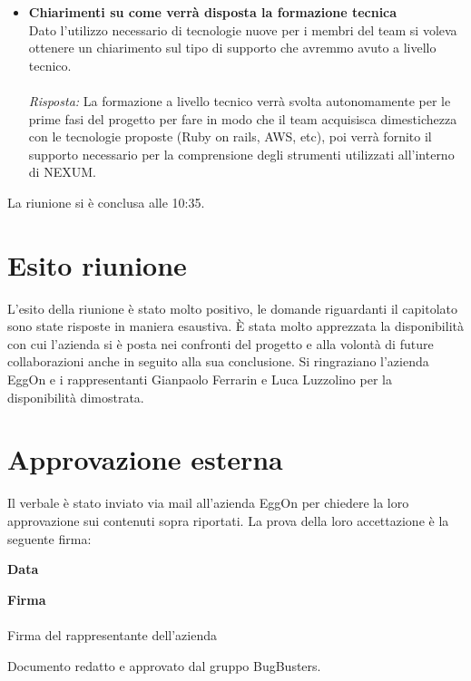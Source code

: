 \documentclass[a4paper,12pt]{article}
\begin{document}
\begin{itemize}
    \item \textbf{Chiarimenti su come verrà disposta la formazione tecnica}\\
    \noindent
    Dato l'utilizzo necessario di tecnologie nuove per i membri del team si voleva ottenere un chiarimento sul tipo di supporto che avremmo avuto a livello tecnico. \\ \\
    \textit{Risposta:} 
    La formazione a livello tecnico verrà svolta autonomamente per le prime fasi del progetto per fare in modo che il team acquisisca dimestichezza con le tecnologie proposte (Ruby on rails, AWS, etc), poi verrà fornito il supporto necessario per la comprensione degli strumenti utilizzati all'interno di NEXUM. 
    \vspace{1em}

\end{itemize}

La riunione si è conclusa alle 10:35.


\section{Esito riunione}
    L'esito della riunione è stato molto positivo, le domande riguardanti il capitolato sono state risposte in maniera esaustiva. È stata molto apprezzata la disponibilità con cui l'azienda si è posta nei confronti del progetto e alla volontà di future collaborazioni anche in seguito alla sua conclusione. Si ringraziano l'azienda EggOn e i rappresentanti Gianpaolo Ferrarin e Luca Luzzolino per la disponibilità dimostrata.
    

\section{Approvazione esterna}
Il verbale è stato inviato via mail all'azienda EggOn per chiedere la loro approvazione sui contenuti sopra riportati. La prova della loro accettazione è la seguente firma:

\vspace{1.5cm}
\noindent\textbf{\Large Data}\\[0.4cm]
\underline{\hspace{4cm}}

\vspace{1.5cm}
\noindent\textbf{\Large Firma}\\[0.8cm]
\underline{\hspace{6cm}} \\[0.2cm]
{\small Firma del rappresentante dell'azienda}

\vfill
\begin{center}
    {\small\color{darkgray} Documento redatto e approvato dal gruppo BugBusters.}
\end{center}
\end{document}
